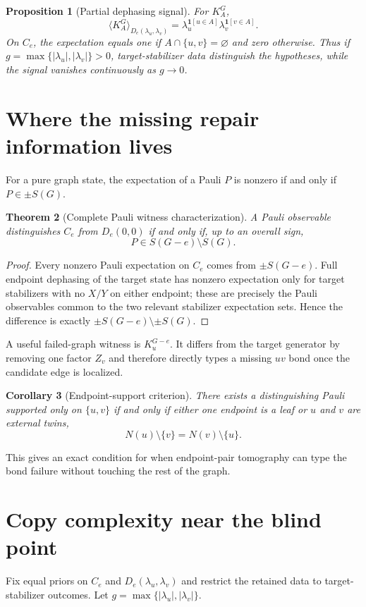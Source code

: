 \documentclass[11pt]{article}
\newtheorem{theorem}{Theorem}[section]
\newtheorem{proposition}[theorem]{Proposition}
\newtheorem{corollary}[theorem]{Corollary}
\begin{document}
\begin{proposition}[Partial dephasing signal]
For $K_A^G$,
\[
\langle K_A^G\rangle_{D_e(\lambda_u,\lambda_v)}=
\lambda_u^{\mathbf1[u\in A]}\lambda_v^{\mathbf1[v\in A]}.
\]
On $C_e$, the expectation equals one if $A\cap\{u,v\}=\varnothing$ and zero otherwise. Thus if $g=\max\{|\lambda_u|,|\lambda_v|\}>0$, target-stabilizer data distinguish the hypotheses, while the signal vanishes continuously as $g\to0$.
\end{proposition}

\section{Where the missing repair information lives}
For a pure graph state, the expectation of a Pauli $P$ is nonzero if and only if $P\in\pm S(G)$.

\begin{theorem}[Complete Pauli witness characterization]
A Pauli observable distinguishes $C_e$ from $D_e(0,0)$ if and only if, up to an overall sign,
\[
P\in S(G-e)\setminus S(G).
\]
\end{theorem}
\begin{proof}
Every nonzero Pauli expectation on $C_e$ comes from $\pm S(G-e)$. Full endpoint dephasing of the target state has nonzero expectation only for target stabilizers with no $X/Y$ on either endpoint; these are precisely the Pauli observables common to the two relevant stabilizer expectation sets. Hence the difference is exactly $\pm S(G-e)\setminus\pm S(G)$.
\end{proof}

A useful failed-graph witness is $K_u^{G-e}$. It differs from the target generator by removing one factor $Z_v$ and therefore directly types a missing $uv$ bond once the candidate edge is localized.

\begin{corollary}[Endpoint-support criterion]
There exists a distinguishing Pauli supported only on $\{u,v\}$ if and only if either one endpoint is a leaf or $u$ and $v$ are external twins,
\[
N(u)\setminus\{v\}=N(v)\setminus\{u\}.
\]
\end{corollary}
This gives an exact condition for when endpoint-pair tomography can type the bond failure without touching the rest of the graph.

\section{Copy complexity near the blind point}
Fix equal priors on $C_e$ and $D_e(\lambda_u,\lambda_v)$ and restrict the retained data to target-stabilizer outcomes. Let $g=\max\{|\lambda_u|,|\lambda_v|\}$.
\end{document}
